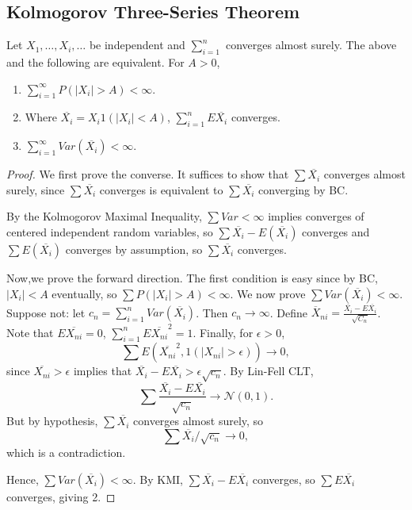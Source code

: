 \documentclass[11pt]{scrartcl}
\begin{document}
\subsection{Kolmogorov Three-Series Theorem}
\begin{thm}  Let $X_1, \dots, X_i, \dots$ be independent and $\sum_{i=1}^n$ converges almost surely.  The above and the following are equivalent.
For $A > 0$,
\begin{enumerate}
\item $\sum_{i=1}^{\infty} P(|X_i| > A) < \infty$.
\item Where $\overline{X_i} = X_i1(|X_i| < A)$, $\sum_{i=1}^n E\overline{X_i}$ converges.
\item $\sum_{i=1}^{\infty} Var(\overline{X_i}) < \infty$.
\end{enumerate}
\end{thm}
\begin{proof}
We first prove the converse.  It suffices to show that $\sum \overline{X_i}$ converges almost surely, since $\sum \overline{X_i}$ converges is equivalent to $\sum \overline{X_i}$ converging by BC.  

By the Kolmogorov Maximal Inequality, $\sum Var < \infty$ implies converges of centered independent random variables, so $\sum \overline{X_i} - E(\overline{X_i})$ converges and $\sum E(\overline{X_i})$ converges by assumption, so $\sum \overline{X_i}$ converges.

Now,we prove the forward direction.  The first condition is easy since by BC, $|X_i| < A$ eventually, so $\sum P(|X_i| > A) < \infty$.  We now prove $\sum Var(\overline{X_i}) < \infty$.  Suppose not: let $c_n = \sum_{i=1}^n Var(\overline{X_i})$.  Then $c_n \to \infty$.  Define $\overline{X}_{ni} = \frac{\overline{X_i} - E\overline{X_i}}{\sqrt{C_n}}$.  Note that $E\overline{X_{ni}} = 0$, $\sum_{i=1}^n E\overline{X_{ni}}^2 = 1$.  Finally, for $\epsilon > 0$,
$$\sum E(\overline{X_{ni}}^2, 1(|X_{ni}| > \epsilon)) \to 0,$$
since $\overline{X_{ni}} > \epsilon$ implies that $\overline{X_i} - E\overline{X_i} > \epsilon \sqrt{c_n}$.  By Lin-Fell CLT, 
$$\sum \frac{\overline{X_i} - E\overline{X_i}}{\sqrt{c_n}} \to \mathcal N(0, 1).$$
But by hypothesis, $\sum \overline{X_i}$ converges almost surely, so
$$\sum \overline{X_i}/\sqrt{c_n} \to 0,$$
which is a contradiction.  

Hence, $\sum Var(\overline{X_i}) < \infty$.  By KMI, $\sum \overline{X_i} - E\overline{X_i}$ converges, so $\sum E \overline{X_i}$ converges, giving 2.
\end{proof}
\pagebreak
\end{document}

